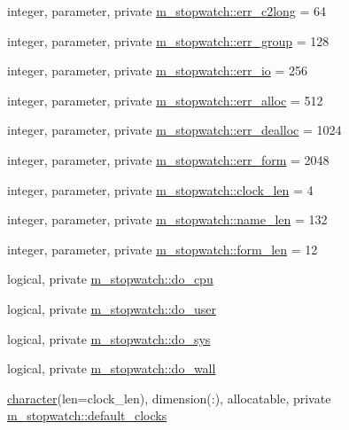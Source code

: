 \begin{DoxyCompactItemize}
\item 
integer, parameter, private \hyperlink{namespacem__stopwatch_a6652c14fa8a139ea7b5a9fdd398fc5cc}{m\+\_\+stopwatch\+::err\+\_\+c2long} = 64
\item 
integer, parameter, private \hyperlink{namespacem__stopwatch_a1c604413553a07ab9a6aad2b069c5550}{m\+\_\+stopwatch\+::err\+\_\+group} = 128
\item 
integer, parameter, private \hyperlink{namespacem__stopwatch_a1a28d40aeec8f031d0be2736dea2dcb0}{m\+\_\+stopwatch\+::err\+\_\+io} = 256
\item 
integer, parameter, private \hyperlink{namespacem__stopwatch_a00c8cbc3b0095ebfbcfd00e7f815171e}{m\+\_\+stopwatch\+::err\+\_\+alloc} = 512
\item 
integer, parameter, private \hyperlink{namespacem__stopwatch_a7e2fd6739245fccd789135d8a1a5b9db}{m\+\_\+stopwatch\+::err\+\_\+dealloc} = 1024
\item 
integer, parameter, private \hyperlink{namespacem__stopwatch_a3f65b21696fb62f2c040db063d475418}{m\+\_\+stopwatch\+::err\+\_\+form} = 2048
\item 
integer, parameter, private \hyperlink{namespacem__stopwatch_aa5f2b7700fd32f070e22af9950c47805}{m\+\_\+stopwatch\+::clock\+\_\+len} = 4
\item 
integer, parameter, private \hyperlink{namespacem__stopwatch_a90c3eba08ec94bd1499d3afcd621d045}{m\+\_\+stopwatch\+::name\+\_\+len} = 132
\item 
integer, parameter, private \hyperlink{namespacem__stopwatch_ae96391d876b6e7b05510e339a2e68d20}{m\+\_\+stopwatch\+::form\+\_\+len} = 12
\item 
logical, private \hyperlink{namespacem__stopwatch_a6856aa4d5ac6088d533a30e1087bb9c8}{m\+\_\+stopwatch\+::do\+\_\+cpu}
\item 
logical, private \hyperlink{namespacem__stopwatch_a29b343b01ae1c7098ed8f78872f8f9e2}{m\+\_\+stopwatch\+::do\+\_\+user}
\item 
logical, private \hyperlink{namespacem__stopwatch_a252497fad53bb1f78a57df3a36ecc963}{m\+\_\+stopwatch\+::do\+\_\+sys}
\item 
logical, private \hyperlink{namespacem__stopwatch_a47f4d2cbcd792fa3ad9eab7b216b06c3}{m\+\_\+stopwatch\+::do\+\_\+wall}
\item 
\hyperlink{option__stopwatch_83_8txt_abd4b21fbbd175834027b5224bfe97e66}{character}(len=clock\+\_\+len), dimension(\+:), allocatable, private \hyperlink{namespacem__stopwatch_a779dc9ad87f18ac158e8ac6cb47601e4}{m\+\_\+stopwatch\+::default\+\_\+clocks}

\end{DoxyCompactItemize}
